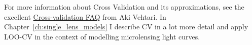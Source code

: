 \documentclass[12pt,dvipsnames]{report}
\newcommand{\ud}{\,\mathrm{d}}
\renewcommand{\vec}[1]{\boldsymbol{\mathbf{#1}}}
\begin{document}
For more information about Cross Validation and its approximations, see the excellent
\href{https://avehtari.github.io/modelselection/CV-FAQ.html}{Cross-validation FAQ}
from Aki Vehtari.
In Chapter~\ref{ch:single_lens_models} I describe CV in a lot more detail and apply
LOO-CV in the context of modelling microlensing light curves.


%
%
\end{document}
